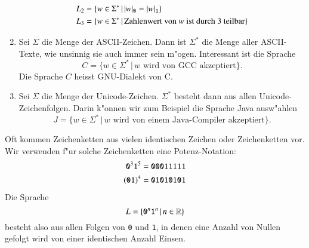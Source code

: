 \begin{enumerate}
\begin{align*}
L_2&=\{ w\in\Sigma^*\,|\, |w|_{\tt 0}=|w|_{\tt 1}\}\\
L_3&=\{ w\in\Sigma^*\,|\, \text{Zahlenwert von $w$ ist durch 3 teilbar}\}
\end{align*}
\item Sei $\Sigma$ die Menge der ASCII-Zeichen. Dann ist $\Sigma^*$ die
Menge aller ASCII-Texte, wie unsinnig sie auch immer sein m"ogen. Interessant
ist die Sprache
\[
C=\{w\in\Sigma^*\,|\,\text{$w$ wird von GCC akzeptiert}\}.
\]
Die Sprache $C$ heisst GNU-Dialekt von C.
\item Sei $\Sigma$ die Menge der Unicode-Zeichen. $\Sigma^*$ besteht
dann aus allen Unicode-Zeichenfolgen. Darin k"onnen wir zum Beispiel die
Sprache Java ausw"ahlen
\[
J
=\{w\in\Sigma^*\,|\, {\text{$w$ wird von einem Java-Compiler akzeptiert}}\}.
\]
\end{enumerate}

Oft kommen Zeichenketten aus vielen identischen Zeichen oder Zeichenketten vor.
Wir verwenden f"ur solche Zeichenketten eine Potenz-Notation:
\begin{align*}
{\tt 0}^3{\tt 1}^5&={\tt 00011111}\\
({\tt 01})^4&={\tt 01010101}
\end{align*}
Die Sprache
\[
L=\{ {\tt 0}^n{\tt 1}^n\,|\,n\in\mathbb R\}
\]
besteht also aus allen Folgen von {\tt 0} und {\tt 1}, in denen eine Anzahl
von Nullen gefolgt wird von einer identischen Anzahl Einsen.
